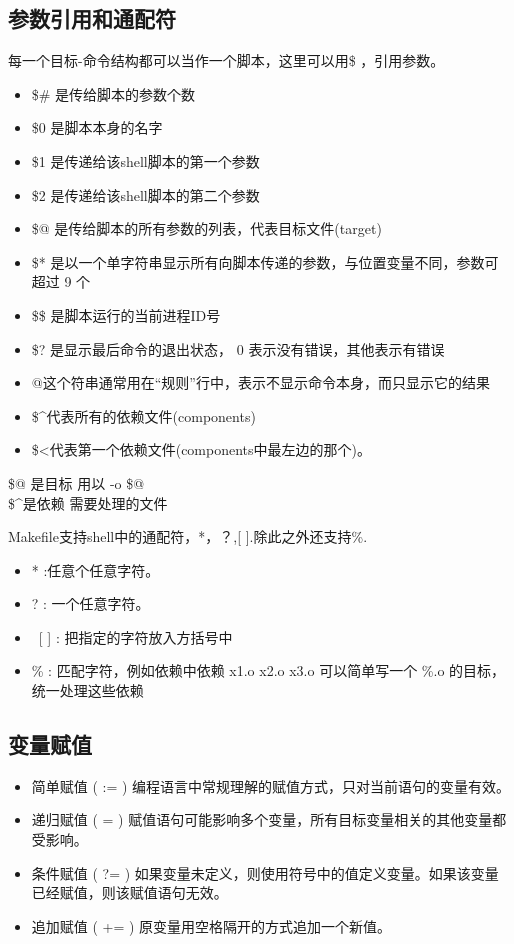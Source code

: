 \documentclass{article}
\begin{document}
\begin{CJK}{UTF8}{gkai}
\subsection{参数引用和通配符}
每一个目标-命令结构都可以当作一个脚本，这里可以用\$ ，引用参数。
\begin{itemize}
	\item \$\# 是传给脚本的参数个数
	\item \$0  是脚本本身的名字
	\item \$1  是传递给该shell脚本的第一个参数
	\item \$2  是传递给该shell脚本的第二个参数
	\item \$@ 是传给脚本的所有参数的列表，代表目标文件(target) 
	\item \$* 是以一个单字符串显示所有向脚本传递的参数，与位置变量不同，参数可超过 9 个
	\item \$\$ 是脚本运行的当前进程ID号
	\item \$? 是显示最后命令的退出状态， 0 表示没有错误，其他表示有错误
	\item @这个符串通常用在“规则”行中，表示不显示命令本身，而只显示它的结果
	\item \$\^{}代表所有的依赖文件(components)
	\item \$\textless 代表第一个依赖文件(components中最左边的那个)。
\end{itemize}
\$@ 是目标  用以  -o \$@ 
	\\ 
\$\^{}是依赖    需要处理的文件 

Makefile支持shell中的通配符，*，？,[ ].除此之外还支持\%.
\begin{itemize}
	\item * :任意个任意字符。
	\item ? : 一个任意字符。
	\item \  [ ] : 把指定的字符放入方括号中
	\item \% : 匹配字符，例如依赖中依赖  x1.o x2.o x3.o  可以简单写一个  \%.o 的目标，统一处理这些依赖
\end{itemize}
\subsection{变量赋值}
\begin{itemize}
	\item 简单赋值 ( := ) 编程语言中常规理解的赋值方式，只对当前语句的变量有效。
	\item 递归赋值 ( = ) 赋值语句可能影响多个变量，所有目标变量相关的其他变量都受影响。
	\item 条件赋值 ( ?= ) 如果变量未定义，则使用符号中的值定义变量。如果该变量已经赋值，则该赋值语句无效。
	\item 追加赋值 ( += ) 原变量用空格隔开的方式追加一个新值。
\end{itemize}


\end{CJK}
\end{document}
